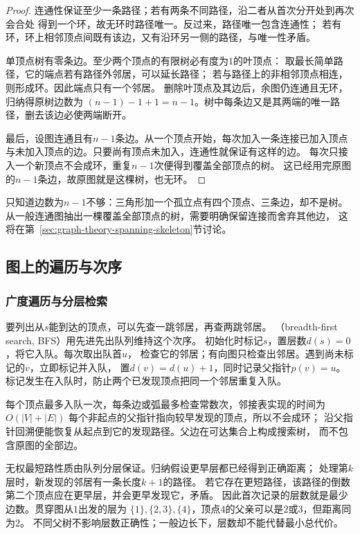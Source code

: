 \begin{proof}
连通性保证至少一条路径；若有两条不同路径，沿二者从首次分开处到再次会合处
得到一个环，故无环时路径唯一。反过来，路径唯一包含连通性；
若有环，环上相邻顶点间既有该边，又有沿环另一侧的路径，与唯一性矛盾。

单顶点树有零条边。至少两个顶点的有限树必有度为\(1\)的叶顶点：
取最长简单路径，它的端点若有路径外邻居，可以延长路径；
若与路径上的非相邻顶点相连，则形成环。因此端点只有一个邻居。
删除叶顶点及其边后，余图仍连通且无环，归纳得原树边数为
\((n-1)-1+1=n-1\)。树中每条边又是其两端的唯一路径，删去该边必使两端断开。

最后，设图连通且有\(n-1\)条边。从一个顶点开始，每次加入一条连接已加入顶点
与未加入顶点的边。只要尚有顶点未加入，连通性就保证有这样的边。
每次只接入一个新顶点不会成环，重复\(n-1\)次便得到覆盖全部顶点的树。
这已经用完原图的\(n-1\)条边，故原图就是这棵树，也无环。
\end{proof}

只知道边数为\(n-1\)不够：三角形加一个孤立点有四个顶点、三条边，却不是树。
从一般连通图抽出一棵覆盖全部顶点的树，需要明确保留连接而舍弃其他边，
这将在第~\ref{sec:graph-theory-spanning-skeleton}节讨论。

\subsection{图上的遍历与次序}

\subsubsection{广度遍历与分层检索}
\label{sec:graph-theory-bfs}

要列出从\(s\)能到达的顶点，可以先查一跳邻居，再查两跳邻居。
（breadth-first search, BFS）用先进先出队列维持这个次序。
初始化时标记\(s\)，置层数\(d(s)=0\)，将它入队。每次取出队首\(u\)，
检查它的邻居；有向图只检查出邻居。遇到尚未标记的\(v\)，立即标记并入队，
置\(d(v)=d(u)+1\)，同时记录父指针\(p(v)=u\)。
标记发生在入队时，防止两个已发现顶点把同一个邻居重复入队。

每个顶点最多入队一次，每条边或弧最多检查常数次，邻接表实现的时间为
\(O(|V|+|E|)\)
每个非起点的父指针指向较早发现的顶点，所以不会成环；
沿父指针回溯便能恢复从起点到它的发现路径。父边在可达集合上构成搜索树，
而不包含原图的全部边。

无权最短路性质由队列分层保证。归纳假设更早层都已经得到正确距离；
处理第\(k\)层时，新发现的邻居有一条长度\(k+1\)的路径。
若它存在更短路径，该路径的倒数第二个顶点应在更早层，并会更早发现它，矛盾。
因此首次记录的层数就是最少边数。贯穿图从\(1\)出发的层为
\(\{1\},\{2,3\},\{4\}\)，顶点\(4\)的父亲可以是\(2\)或\(3\)，但距离同为\(2\)。
不同父树不影响层数正确性；一般边长下，层数却不能代替最小总代价。

